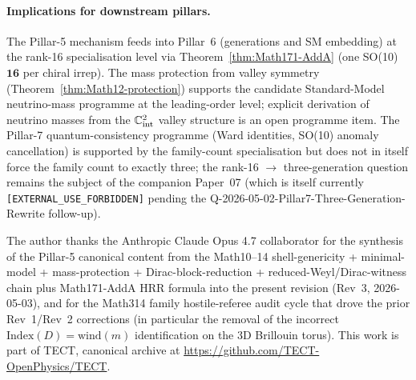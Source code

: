 \paragraph{Implications for downstream pillars.}
The Pillar-5 mechanism feeds into Pillar~6 (generations and SM
embedding) at the rank-16 specialisation level via
Theorem~\ref{thm:Math171-AddA} (one SO(10) $\mathbf{16}$ per chiral
irrep). The mass protection from valley symmetry
(Theorem~\ref{thm:Math12-protection}) supports the candidate
Standard-Model neutrino-mass programme at the leading-order level;
explicit derivation of neutrino masses from the
$\mathbb{C}^2_{\rm int}$ valley structure is an open programme
item. The Pillar-7 quantum-consistency programme (Ward identities,
SO(10) anomaly cancellation) is supported by the family-count
specialisation but does not in itself force the family count to
exactly three; the rank-16 $\to$ three-generation question remains
the subject of the companion Paper~07 (which is itself currently
\texttt{[EXTERNAL\_USE\_FORBIDDEN]} pending the
Q-2026-05-02-Pillar7-Three-Generation-Rewrite follow-up).

\begin{acknowledgments}
The author thanks the Anthropic Claude Opus 4.7 collaborator for
the synthesis of the Pillar-5 canonical content from the Math10--14
shell-genericity + minimal-model + mass-protection + Dirac-block-reduction
+ reduced-Weyl/Dirac-witness chain plus Math171-AddA HRR formula
into the present revision (Rev~3, 2026-05-03), and for the Math314
family hostile-referee audit cycle that drove the prior Rev~1/Rev~2
corrections (in particular the removal of the incorrect
$\mathrm{Index}(D) = \mathrm{wind}(m)$ identification on the 3D
Brillouin torus). This work is part of TECT, canonical archive at
\url{https://github.com/TECT-OpenPhysics/TECT}.
\end{acknowledgments}





